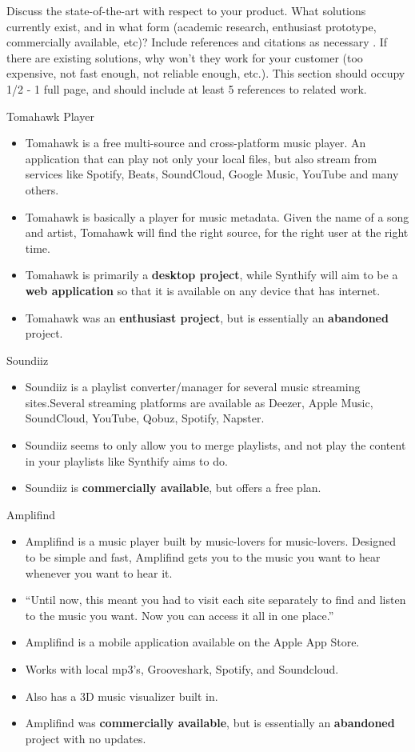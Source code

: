 Discuss the state-of-the-art with respect to your product. What solutions currently exist, and in what form (academic research, enthusiast prototype, commercially available, etc)? Include references and citations as necessary \cite{Rubin2012}. If there are existing solutions, why won't they work for your customer (too expensive, not fast enough, not reliable enough, etc.). This section should occupy 1/2 - 1 full page, and should include at least 5 references to related work.

Tomahawk Player \cite{tomahawk}
\begin{itemize}
  \item Tomahawk is a free multi-source and cross-platform music player. An application that can play not only your local files, but also stream from services like Spotify, Beats, SoundCloud, Google Music, YouTube and many others.
  \item Tomahawk is basically a player for music metadata. Given the name of a song and artist, Tomahawk will find the right source, for the right user at the right time.
  \item Tomahawk is primarily a \textbf{desktop project}, while Synthify will aim to be a \textbf{web application} so that it is available on any device that has internet.
  \item Tomahawk was an \textbf{enthusiast project}, but is essentially an \textbf{abandoned} project.
\end{itemize}

Soundiiz \cite{soundiiz}
\begin{itemize}
  \item Soundiiz is a playlist converter/manager for several music streaming sites.Several streaming platforms are available as Deezer, Apple Music, SoundCloud, YouTube, Qobuz, Spotify, Napster.
  \item Soundiiz seems to only allow you to merge playlists, and not play the content in your playlists like Synthify aims to do.
  \item Soundiiz is \textbf{commercially available}, but offers a free plan.
\end{itemize}

Amplifind \cite{amplifind}
\begin{itemize}
  \item Amplifind is a music player built by music-lovers for music-lovers. Designed to be simple and fast, Amplifind gets you to the music you want to hear whenever you want to hear it.
  \item “Until now, this meant you had to visit each site separately to find and listen to the music you want. Now you can access it all in one place.”
  \item Amplifind is a mobile application available on the Apple App Store.
  \item Works with local mp3’s, Grooveshark, Spotify, and Soundcloud.
  \item Also has a 3D music visualizer built in.
  \item Amplifind was \textbf{commercially available}, but is essentially an \textbf{abandoned} project with no updates.
\end{itemize}
